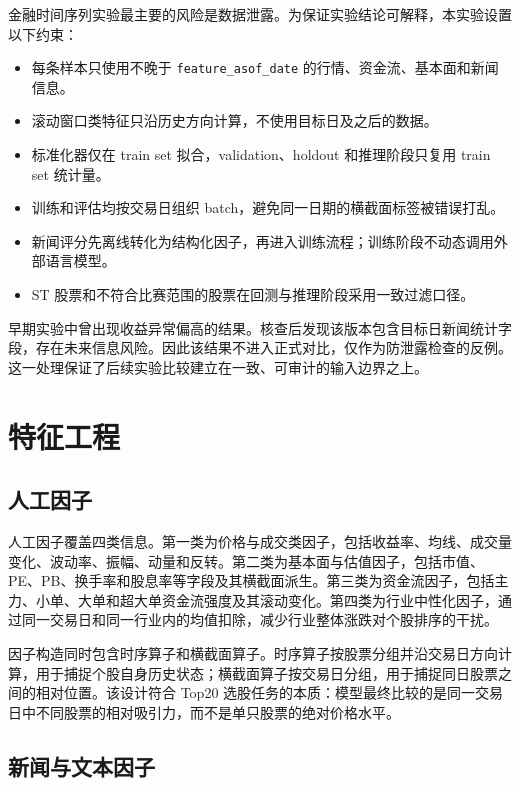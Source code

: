 \documentclass[UTF8,a4paper,12pt,fontset=none]{ctexart}
\begin{document}
金融时间序列实验最主要的风险是数据泄露。为保证实验结论可解释，本实验设置以下约束：

\begin{itemize}
  \item 每条样本只使用不晚于 \texttt{feature\_asof\_date} 的行情、资金流、基本面和新闻信息。
  \item 滚动窗口类特征只沿历史方向计算，不使用目标日及之后的数据。
  \item 标准化器仅在 train set 拟合，validation、holdout 和推理阶段只复用 train set 统计量。
  \item 训练和评估均按交易日组织 batch，避免同一日期的横截面标签被错误打乱。
  \item 新闻评分先离线转化为结构化因子，再进入训练流程；训练阶段不动态调用外部语言模型。
  \item ST 股票和不符合比赛范围的股票在回测与推理阶段采用一致过滤口径。
\end{itemize}

早期实验中曾出现收益异常偏高的结果。核查后发现该版本包含目标日新闻统计字段，存在未来信息风险。因此该结果不进入正式对比，仅作为防泄露检查的反例。这一处理保证了后续实验比较建立在一致、可审计的输入边界之上。

\section{特征工程}

\subsection{人工因子}

人工因子覆盖四类信息。第一类为价格与成交类因子，包括收益率、均线、成交量变化、波动率、振幅、动量和反转。第二类为基本面与估值因子，包括市值、PE、PB、换手率和股息率等字段及其横截面派生。第三类为资金流因子，包括主力、小单、大单和超大单资金流强度及其滚动变化。第四类为行业中性化因子，通过同一交易日和同一行业内的均值扣除，减少行业整体涨跌对个股排序的干扰。

因子构造同时包含时序算子和横截面算子。时序算子按股票分组并沿交易日方向计算，用于捕捉个股自身历史状态；横截面算子按交易日分组，用于捕捉同日股票之间的相对位置。该设计符合 Top20 选股任务的本质：模型最终比较的是同一交易日中不同股票的相对吸引力，而不是单只股票的绝对价格水平。

\subsection{新闻与文本因子}
\end{document}
